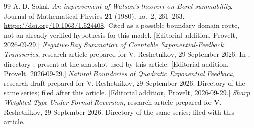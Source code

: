 \documentclass[11pt,a4paper]{article}
\numberwithin{equation}{section}
\theoremstyle{definition}\newtheorem{definition}[theorem]{Definition}
\theoremstyle{remark}\newtheorem{remark}[theorem]{Remark}
\begin{document}
\begin{thebibliography}{99}
A. D. Sokal, \emph{An improvement of Watson's theorem on Borel
summability}, Journal of Mathematical Physics \textbf{21} (1980),
no.~2, 261--263. \url{https://doi.org/10.1063/1.524408}.
Cited as a possible boundary-domain route, not an already verified
hypothesis for this model.
[Editorial addition, ProveIt, 2026-09-29.] \emph{Negative-Ray Summation of
Countable Exponential-Feedback Transseries}, research article prepared for
V. Reshetnikov, 29 September 2026. In \cite{repo}, directory
; present at the
snapshot used by this article.
[Editorial addition, ProveIt, 2026-09-29.] \emph{Natural Boundaries of
Quadratic Exponential Feedback}, research draft prepared for
V. Reshetnikov, 29 September 2026. Directory
 of the same
series; filed after this article.
[Editorial addition, ProveIt, 2026-09-29.] \emph{Sharp Weighted Type Under
Formal Reversion}, research article prepared for V. Reshetnikov,
29 September 2026. Directory 
of the same series; filed with this article.
\end{thebibliography}
\endgroup
\end{document}

